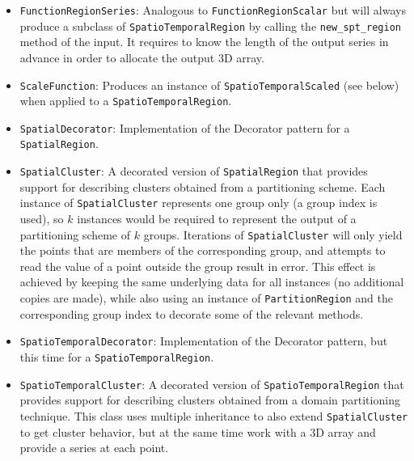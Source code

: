\begin{itemize}
	\item \texttt{FunctionRegionSeries}: Analogous to \texttt{FunctionRegionScalar} but will always produce a subclass of \texttt{SpatioTemporalRegion} by calling the \texttt{new\_spt\_region} method of the input. It requires to know the length of the output series in advance in order to allocate the output 3D array.
	
	\item \texttt{ScaleFunction}: Produces an instance of \texttt{SpatioTemporalScaled} (see below) when applied to a \texttt{SpatioTemporalRegion}.
	
	\item \texttt{SpatialDecorator}: Implementation of the Decorator pattern for a \texttt{SpatialRegion}.
	
	\item \texttt{SpatialCluster}: A decorated version of \texttt{SpatialRegion} that provides support for describing clusters obtained from a partitioning scheme. Each instance of \texttt{SpatialCluster} represents one group only (a group index is used), so $k$ instances would be required to represent the output of a partitioning scheme of $k$ groups. Iterations of \texttt{SpatialCluster} will only yield the points that are members of the corresponding group, and attempts to read the value of a point outside the group result in error. This effect is achieved by keeping the same underlying data for all instances (no additional copies are made), while also using an instance of \texttt{PartitionRegion} and the corresponding group index to decorate some of the relevant methods.
	
	\item \texttt{SpatioTemporalDecorator}: Implementation of the Decorator pattern, but this time for a \texttt{SpatioTemporalRegion}.
	
	\item \texttt{SpatioTemporalCluster}: A decorated version of \texttt{SpatioTemporalRegion} that provides support for describing clusters obtained from a domain partitioning technique. This class uses multiple inheritance to also extend \texttt{SpatialCluster} to get cluster behavior, but at the same time work with a 3D array and provide a series at each point.
	

\end{itemize}
